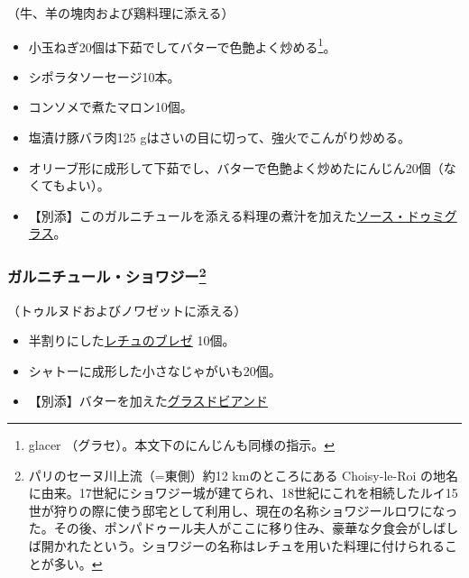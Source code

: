 \begin{recette}
（牛、羊の塊肉および鶏料理に添える）

\begin{itemize}
\item
  小玉ねぎ20個は下茹でしてバターで色艶よく炒める\footnote{glacer
    （グラセ）。本文下のにんじんも同様の指示。}。
\item
  シポラタソーセージ10本。
\item
  コンソメで煮たマロン10個。
\item
  塩漬け豚バラ肉125 gはさいの目に切って、強火でこんがり炒める。
\item
  オリーブ形に成形して下茹でし、バターで色艶よく炒めたにんじん20個（なくてもよい）。
\item
  【別添】このガルニチュールを添える料理の煮汁を加えた\protect\hyperlink{sauce-demi-glace}{ソース・ドゥミグラス}。
\end{itemize}

\atoaki{}

\hypertarget{garniture-choisy}{%
\subsubsection[ガルニチュール・ショワジー]{\texorpdfstring{ガルニチュール・ショワジー\footnote{パリのセーヌ川上流（=東側）約12
  kmのところにある Choisy-le-Roi
  の地名に由来。17世紀にショワジー城が建てられ、18世紀にこれを相続したルイ15世が狩りの際に使う邸宅として利用し、現在の名称ショワジールロワになった。その後、ポンパドゥール夫人がここに移り住み、豪華な夕食会がしばしば開かれたという。ショワジーの名称はレチュを用いた料理に付けられることが多い。}}{ガルニチュール・ショワジー}}\label{garniture-choisy}}



（トゥルヌドおよびノワゼットに添える）

\begin{itemize}
\item
  半割りにした\protect\hyperlink{laitue-braise}{レチュのブレゼ} 10個。
\item
  シャトーに成形した小さなじゃがいも20個。
\item
  【別添】バターを加えた\protect\hyperlink{glace-de-viande}{グラスドビアンド}
\end{itemize}


\end{recette}
